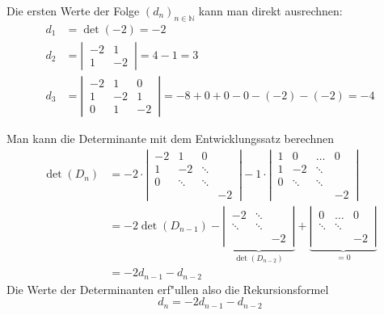 \begin{loesung}
\begin{teilaufgaben}
\item
Die ersten Werte der Folge $(d_n)_{n\in\mathbb N}$ kann man direkt ausrechnen:
\begin{align*}
d_1&=\det(-2)=-2\\
d_2&=\left|\,
\begin{matrix}-2&1\\1&-2\end{matrix}
\,\right|=4-1=3
\\
d_3&=\left|\,
\begin{matrix}
-2& 1& 0\\
 1&-2& 1\\
 0& 1&-2
\end{matrix}
\,\right|=-8+0+0-0-(-2)-(-2)=-4
\end{align*}
\item
Man kann die Determinante mit dem Entwicklungssatz berechnen
\begin{align*}
\det(D_n)
&=
-2\cdot
\left|\,
\begin{matrix}
-2&     1&     0&  \\
 1&    -2&\ddots&  \\
 0&\ddots&\ddots&  \\
  &      &      &-2
\end{matrix}
\,\right|
-1\cdot
\left|\,
\begin{matrix}
 1&     0&\dots & 0\\
 1&    -2&\ddots&  \\
 0&\ddots&\ddots&  \\
  &      &      &-2
\end{matrix}
\,\right|
\\
&=
-2\det(D_{n-1})
-\underbrace{\left|\,
\begin{matrix}
    -2&\ddots&  \\
\ddots&\ddots&  \\
      &      &-2
\end{matrix}
\,\right|}_{\det(D_{n-2})}
+\underbrace{\left|\,
\begin{matrix}
     0&\dots & 0\\
\ddots&\ddots&  \\
      &      &-2
\end{matrix}
\,\right|}_{=0}
\\
&=-2d_{n-1}-d_{n-2}
\end{align*}
Die Werte der Determinanten erf"ullen also die Rekursionsformel
\[
d_n=-2d_{n-1}-d_{n-2}
\]



\end{teilaufgaben}
\end{loesung}

